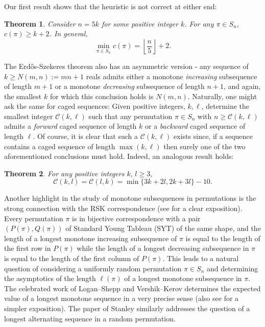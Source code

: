 \documentclass[11pt, a4paper]{article}
\theoremstyle{compact}
\newtheorem{theorem}{Theorem}[section]
\begin{document}
Our first result shows that the heuristic is not correct at either end:
\begin{theorem}\label{caged}
    Consider $n = 5k $ for some positive integer $k$. For any $\pi \in S_n$, $\displaystyle c(\pi) \geq k + 2$. In general, $$\displaystyle \min_{\pi \in S_n} c(\pi) = \left\lfloor\frac{n}{5}\right\rfloor + 2 . $$
\end{theorem}
 The Erd\H{o}s-Szekeres theorem also has an asymmetric version - any sequence of $k\ge N(m,n):=mn+1$ reals admits either a monotone \emph{increasing} subsequence of length $m+1$ or a monotone \emph{decreasing} subsequence of length $n+1$, and again, the smallest $k$ for which this conclusion holds is $N(m,n)$. Naturally, one might ask the same for caged sequences: Given positive integers, $k,\ell$, determine the smallest integer $\mathcal{C}(k,\ell)$ such that any permutation $\pi\in S_n$ with $n\ge\mathcal{C}(k,\ell)$ admits a \emph{forward} caged sequence of length $k$ or a \emph{backward} caged sequence of length $\ell$. Of course, it is clear that such a $\mathcal{C}(k,\ell)$ exists since, if a sequence contains a caged sequence of length $\max(k,\ell)$ then surely one of the two aforementioned conclusions must hold. Indeed, an analogous result holds:
\begin{theorem}\label{asymmetric}
    For any positive integers $k,\, l \geq 3$,
    \[
    \mathcal{C}(k,l) = \mathcal{C}(l,k)  = \min \{ 3k + 2l, 2k + 3l\} - 10.
    \]
\end{theorem} 
Another highlight in the study of monotone subsequences in permutations is the strong connection with the RSK correspondence (see \cite{Sag} for a clear exposition). Every permutation $\pi$ is in bijective correspondence with a pair $(P(\pi),Q(\pi))$ of Standard Young Tableau (SYT) of the same shape, and the length of a longest monotone increasing subsequence of $\pi$ is equal to the length of the first row in $P(\pi)$ while the length of a longest decreasing subsequence in $\pi$ is equal to the length of the first column of $P(\pi)$. This leads to a natural question of considering a uniformly random permutation $\pi\in S_n$ and determining the asymptotics of the length $\ell(\pi)$ of a longest monotone subsequence in $\pi$. The celebrated work of Logan–Shepp \cite{LogShep} and Vershik–Kerov \cite{VerKer} determines the expected value of a longest monotone sequence in a very precise sense (also see \cite{Sur_math} for a simpler exposition). The paper of Stanley \cite{Stan} similarly addresses the question of a longest alternating sequence in a random permutation.\\
\end{document}
